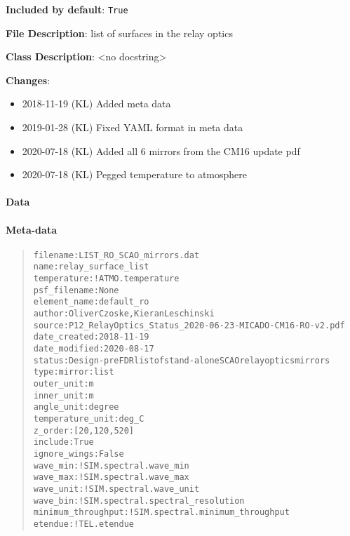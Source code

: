 \textbf{Included by default}: \texttt{True}

\textbf{File Description}: list of surfaces in the relay optics

\textbf{Class Description}: <no docstring>

\textbf{Changes}:

\begin{itemize}
\item 2018-11-19 (KL) Added meta data

\item 2019-01-28 (KL) Fixed YAML format in meta data

\item 2020-07-18 (KL) Added all 6 mirrors from the CM16 update pdf

\item 2020-07-18 (KL) Pegged temperature to atmosphere
\end{itemize}


\paragraph{Data%
  \label{id1}%
}


\paragraph{Meta-data%
  \label{id2}%
}

\begin{quote}
\begin{alltt}
          filename : LIST_RO_SCAO_mirrors.dat
              name : relay_surface_list
       temperature : !ATMO.temperature
      psf_filename : None
      element_name : default_ro
            author : Oliver Czoske, Kieran Leschinski
            source : P12_RelayOptics_Status_2020-06-23-MICADO-CM16-RO-v2.pdf
      date_created : 2018-11-19
     date_modified : 2020-08-17
            status : Design - pre FDR list of stand-alone SCAO relay optics mirrors
              type : mirror:list
        outer_unit : m
        inner_unit : m
        angle_unit : degree
  temperature_unit : deg_C
           z_order : [20, 120, 520]
           include : True
      ignore_wings : False
          wave_min : !SIM.spectral.wave_min
          wave_max : !SIM.spectral.wave_max
         wave_unit : !SIM.spectral.wave_unit
          wave_bin : !SIM.spectral.spectral_resolution
minimum_throughput : !SIM.spectral.minimum_throughput
           etendue : !TEL.etendue
\end{alltt}
\end{quote}
